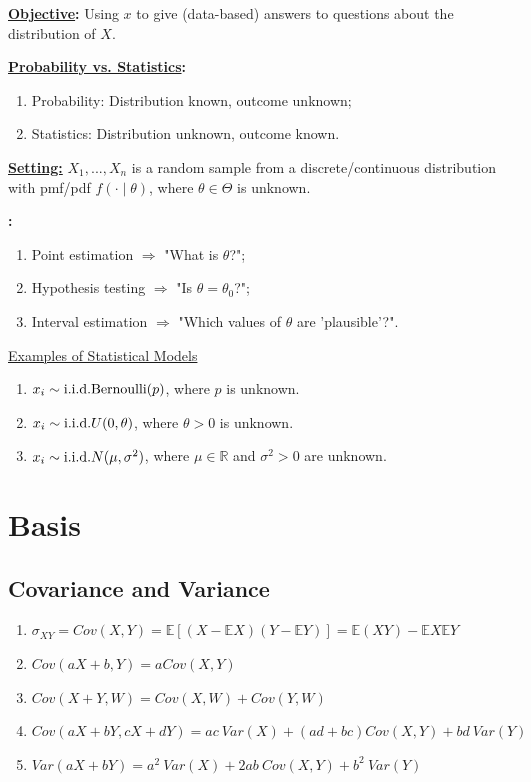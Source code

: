 \documentclass[11pt]{elegantbook}
\begin{document}
\textbf{\underline{Objective}:} Using $x$ to give (data-based) answers to questions about the distribution of $X$.

\textbf{\underline{Probability vs. Statistics}:}
\begin{enumerate}[$\circ$]
    \item Probability: Distribution known, outcome unknown;
    \item Statistics: Distribution unknown, outcome known.
\end{enumerate}

\textbf{\underline{Setting:}} $X_1,...,X_n$ is a random sample from a discrete/continuous distribution with pmf/pdf $f(\cdot\mid \theta)$, where $\theta\in\Theta$ is unknown.

\textbf{:}
\begin{enumerate}[$\circ$]
    \item Point estimation $\Rightarrow$ "What is $\theta$?";
    \item Hypothesis testing $\Rightarrow$ "Is $\theta=\theta_0$?";
    \item Interval estimation $\Rightarrow$ "Which values of $\theta$ are 'plausible'?".
\end{enumerate}

\begin{example}
    \underline{Examples of Statistical Models}
    \begin{enumerate}[(1).]
        \item $x_i\sim \textnormal{i.i.d.} \textnormal{Bernoulli}(p)$, where $p$ is unknown.
        \item $x_i\sim \textnormal{i.i.d.} U(0,\theta)$, where $\theta>0$ is unknown.
        \item $x_i\sim \textnormal{i.i.d.} N(\mu,\sigma^2)$, where $\mu\in \mathbb{R}$ and $\sigma^2>0$ are unknown.
    \end{enumerate}
\end{example}


\chapter{Basis}
\section{Covariance and Variance}
\begin{enumerate}[(1)]
    \item $\sigma_{XY}=Cov(X,Y)=\mathbb{E}\left[(X-\mathbb{E}X)(Y-\mathbb{E}Y)\right]=\mathbb{E}(XY)-\mathbb{E}X\mathbb{E}Y$
    \item $Cov(aX+b,Y)=aCov(X,Y)$
    \item $Cov(X+Y,W)=Cov(X,W)+Cov(Y,W)$
    \item $Cov(aX+bY,cX+dY)=ac\ {Var}(X)+(ad+bc)Cov(X,Y)+bd\ {Var}(Y)$
    \item $Var(aX+bY)=a^2\ {Var}(X)+2ab\ Cov(X,Y)+b^2\ {Var}(Y)$
\end{enumerate}
\end{document}
